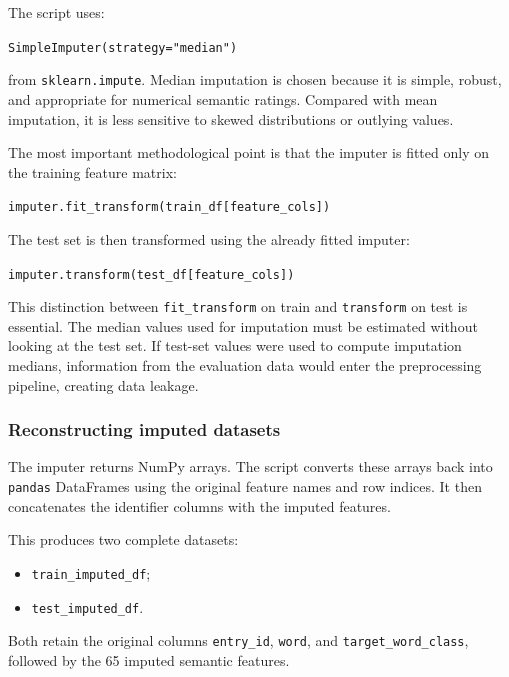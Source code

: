 \documentclass{ipgpmaster}
\begin{document}
The script uses:

\begin{center}
\texttt{SimpleImputer(strategy="median")}
\end{center}

from \texttt{sklearn.impute}. Median imputation is chosen because it is simple, robust, and appropriate for numerical semantic ratings. Compared with mean imputation, it is less sensitive to skewed distributions or outlying values.

The most important methodological point is that the imputer is fitted only on the training feature matrix:

\begin{center}
\texttt{imputer.fit\_transform(train\_df[feature\_cols])}
\end{center}

The test set is then transformed using the already fitted imputer:

\begin{center}
\texttt{imputer.transform(test\_df[feature\_cols])}
\end{center}

This distinction between \texttt{fit\_transform} on train and \texttt{transform} on test is essential. The median values used for imputation must be estimated without looking at the test set. If test-set values were used to compute imputation medians, information from the evaluation data would enter the preprocessing pipeline, creating data leakage.

\subsubsection{Reconstructing imputed datasets}

The imputer returns NumPy arrays. The script converts these arrays back into \texttt{pandas} DataFrames using the original feature names and row indices. It then concatenates the identifier columns with the imputed features.

This produces two complete datasets:

\begin{itemize}
    \item \texttt{train\_imputed\_df};
    \item \texttt{test\_imputed\_df}.
\end{itemize}

Both retain the original columns \texttt{entry\_id}, \texttt{word}, and \texttt{target\_word\_class}, followed by the 65 imputed semantic features.
\end{document}
